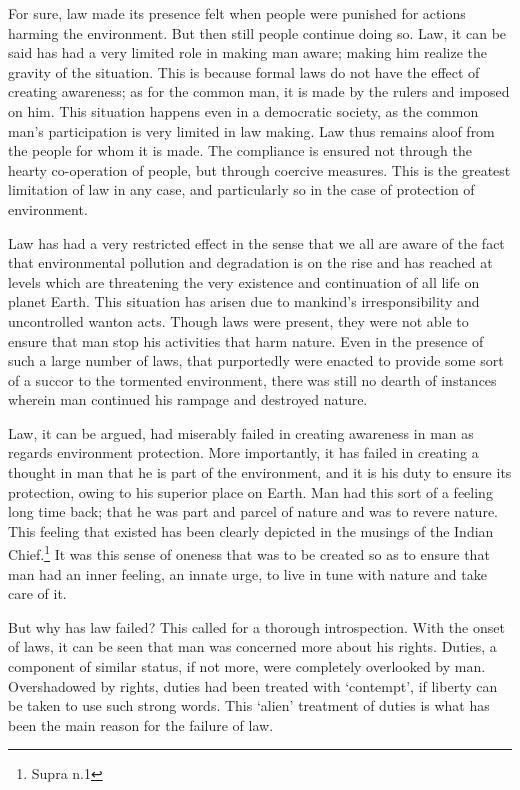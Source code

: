 \begin{multicols}{2}
\noi
For sure, law made its presence felt when people were punished for actions harming the
environment. But then still people continue doing so. Law, it can be said has had a very limited
role in making man aware; making him realize the gravity of the situation. This is because
formal laws do not have the effect of creating awareness; as for the common man, it is made
by the rulers and imposed on him. This situation happens even in a democratic society, as the
common man’s participation is very limited in law making. Law thus remains aloof from the
people for whom it is made. The compliance is ensured not through the hearty co-operation of
people, but through coercive measures. This is the greatest limitation of law in any case, and
particularly so in the case of protection of environment.

\vspace{-.15cm}

\noi
Law has had a very restricted effect in the sense that we all are aware of the fact that
environmental pollution and degradation is on the rise and has reached at levels which are
threatening the very existence and continuation of all life on planet Earth. This situation has
arisen due to mankind’s irresponsibility and uncontrolled wanton acts. Though laws were
present, they were not able to ensure that man stop his activities that harm nature. Even in the
presence of such a large number of laws, that purportedly were enacted to provide some sort
of a succor to the tormented environment, there was still no dearth of instances wherein man
continued his rampage and destroyed nature.

\vspace{-.1cm}

\noi
Law, it can be argued, had miserably failed in creating awareness in man as regards
environment protection. More importantly, it has failed in creating a thought in man that he is
part of the environment, and it is his duty to ensure its protection, owing to his superior place
on Earth. Man had this sort of a feeling long time back; that he was part and parcel of nature
and was to revere nature. This feeling that existed has been clearly depicted in the musings of
the Indian Chief.\footnote{Supra n.1} It was this sense of oneness that was to be created so as to ensure that man
had an inner feeling, an innate urge, to live in tune with nature and take care of it.

\vspace{-.1cm}

\noi
But why has law failed? This called for a thorough introspection. With the onset of laws, it
can be seen that man was concerned more about his rights. Duties, a component of similar
status, if not more, were completely overlooked by man. Overshadowed by rights, duties had
been treated with ‘contempt’, if liberty can be taken to use such strong words. This ‘alien’
treatment of duties is what has been the main reason for the failure of law.


\end{multicols}
